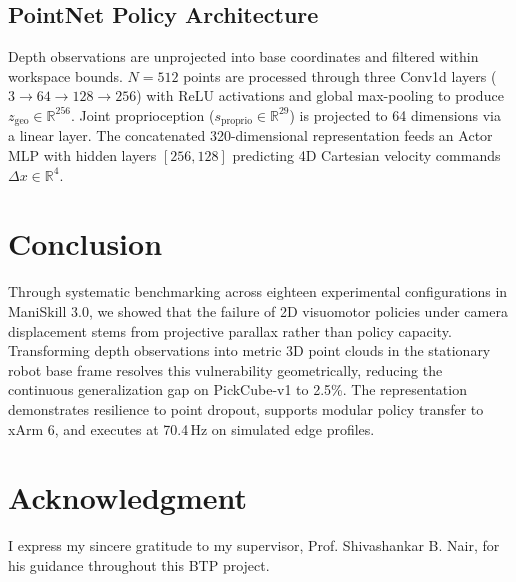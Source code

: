 \documentclass[conference]{IEEEtran}
\begin{document}
\subsection{PointNet Policy Architecture}
Depth observations are unprojected into base coordinates and filtered within workspace bounds. $N=512$ points are processed through three Conv1d layers ($3 \to 64 \to 128 \to 256$) with ReLU activations and global max-pooling to produce $z_{\text{geo}} \in \mathbb{R}^{256}$. Joint proprioception ($s_{\text{proprio}} \in \mathbb{R}^{29}$) is projected to 64 dimensions via a linear layer. The concatenated 320-dimensional representation feeds an Actor MLP with hidden layers $[256, 128]$ predicting 4D Cartesian velocity commands $\Delta x \in \mathbb{R}^4$.

\section{Conclusion}
Through systematic benchmarking across eighteen experimental configurations in ManiSkill 3.0, we showed that the failure of 2D visuomotor policies under camera displacement stems from projective parallax rather than policy capacity. Transforming depth observations into metric 3D point clouds in the stationary robot base frame resolves this vulnerability geometrically, reducing the continuous generalization gap on PickCube-v1 to 2.5\%. The representation demonstrates resilience to point dropout, supports modular policy transfer to xArm 6, and executes at 70.4\,Hz on simulated edge profiles.

\section*{Acknowledgment}
I express my sincere gratitude to my supervisor, Prof. Shivashankar B. Nair, for his guidance throughout this BTP project.
\end{document}

